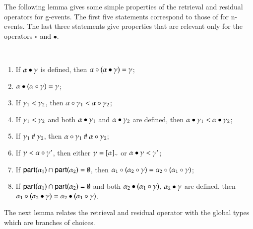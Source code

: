 \bigskip

 The following lemma %
 gives some simple properties
of the retrieval and residual operators for g-events. 
The first five  statements  correspond to those of 
for n-events. 
The last three  statements  
give properties 
 that are relevant  only for the operators $\circ$ and $\bullet$.
\begin{lemma}\text{~}\\[-10pt]
\begin{enumerate}
\item {} If $\postG{\comocc}{\alpha}$ is defined, then $\preG{(\postG{\comocc}{\alpha})}{\alpha}=\comocc$;
\item {} 
$\postG{(\preG{\comocc}{\alpha})}{\alpha}=\comocc$;
 \item  {}  If  $\comocc_1< \comocc_2$, 
then $\preG{\comocc_1}{\alpha}< \preG{\comocc_2}{\alpha}$;
\item {} If  $\comocc_1<\comocc_2$ and  both $\postG{\comocc_1}{\alpha}$ and
  $\postG{\comocc_2}{\alpha}$ %
  are 
  defined, then
  $\postG{\comocc_1}{\alpha}< \postG{\comocc_2}{\alpha}$;
 \item {}  If $\comocc_1\gr \comocc_2$, 
then $\preG{\comocc_1}{\alpha}\gr \preG{\comocc_2}{\alpha}$;
  \item {} If $\comocc<\preG{\comocc'}{\alpha}$, then either $\comocc=\eqclass\alpha$ or $\postG{\comocc}{\alpha}<{\comocc'}$;
 \item {}  If $\participant{\alpha_1}\cap\participant{\alpha_2}=\emptyset$, then $\preG{(\preG{\comocc}{\alpha_2})}{\alpha_1}=\preG{(\preG{\comocc}{\alpha_1})}{\alpha_2}$;
 \item {} If $\participant{\alpha_1}\cap\participant{\alpha_2}=\emptyset$ and both $\postG{(\preG{\comocc}{\alpha_1})}{\alpha_2}$, $\postG{\comocc}{\alpha_2}$ are defined, then $\preG{(\postG{\comocc}{\alpha_2})}{\alpha_1}= \postG{(\preG{\comocc}{\alpha_1})}{\alpha_2}$.
\end{enumerate}
\end{lemma}


 The next lemma relates the retrieval and residual operator with the global types which are branches of choices. 

